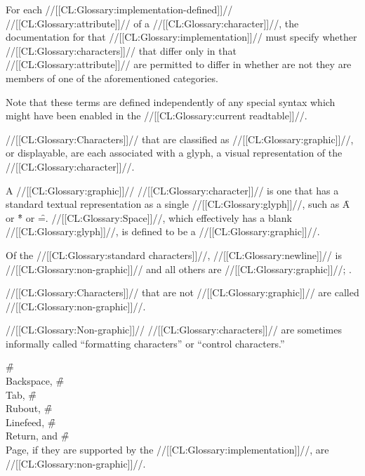 For each //[[CL:Glossary:implementation-defined]]// //[[CL:Glossary:attribute]]// of a //[[CL:Glossary:character]]//,
the documentation for that //[[CL:Glossary:implementation]]// must specify whether 
//[[CL:Glossary:characters]]// that differ only in that //[[CL:Glossary:attribute]]// are permitted to differ
in whether are not they are members of one of the aforementioned categories.

Note that these terms are defined independently of any special syntax 
which might have been enabled in the //[[CL:Glossary:current readtable]]//.


//[[CL:Glossary:Characters]]// that are classified as //[[CL:Glossary:graphic]]//, or displayable, are each
associated with a glyph, a visual representation of the //[[CL:Glossary:character]]//.




A //[[CL:Glossary:graphic]]// //[[CL:Glossary:character]]// is one that has a standard textual 
representation as a single //[[CL:Glossary:glyph]]//, such as \f{A} or \f{*} or \f{=}.
//[[CL:Glossary:Space]]//, which effectively has a blank //[[CL:Glossary:glyph]]//, is defined
to be a //[[CL:Glossary:graphic]]//.

Of the //[[CL:Glossary:standard characters]]//,
     //[[CL:Glossary:newline]]// is //[[CL:Glossary:non-graphic]]// 
 and all others are //[[CL:Glossary:graphic]]//; \seesection\StandardChars.

//[[CL:Glossary:Characters]]// that are not //[[CL:Glossary:graphic]]// are called //[[CL:Glossary:non-graphic]]//.

//[[CL:Glossary:Non-graphic]]// //[[CL:Glossary:characters]]// are sometimes informally called
    ``formatting characters'' 
 or ``control characters.''

\f{\#\\Backspace},
\f{\#\\Tab},
\f{\#\\Rubout},
\f{\#\\Linefeed}, 
\f{\#\\Return}, and
\f{\#\\Page},
if they are supported by the //[[CL:Glossary:implementation]]//,
are //[[CL:Glossary:non-graphic]]//.












